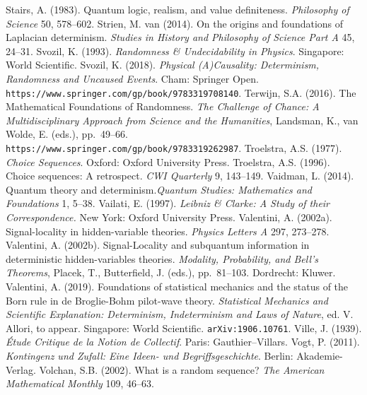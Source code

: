\documentclass[12pt]{article}
\numberwithin{equation}{section}
\begin{document}
\begin{thebibliography}{99}
  \bibitem{}
 Stairs, A. (1983).
 Quantum logic, realism, and value definiteness. \emph{Philosophy of Science} 50, 578--602. 
       \bibitem{}  Strien, M. van (2014). On the origins and foundations of Laplacian determinism.
       \emph{Studies in History and
 Philosophy of Science Part A} 45, 24--31.
  \bibitem{}  Svozil, K. (1993). \emph{Randomness \& Undecidability in Physics}. Singapore: World Scientific. 
   \bibitem{}  Svozil, K. (2018). \emph{Physical (A)Causality:
Determinism, Randomness and Uncaused Events}. Cham: Springer Open.  \verb#https://www.springer.com/gp/book/9783319708140#. 
 \bibitem{}  Terwijn, S.A. (2016). The Mathematical Foundations of Randomness. 
 \emph{The Challenge of Chance: A Multidisciplinary Approach from Science and the Humanities},   Landsman, K., van Wolde, E. (eds.),  pp.\ 49--66.  \verb#https://www.springer.com/gp/book/9783319262987#.
   \bibitem{}  Troelstra, A.S. (1977). \emph{Choice Sequences}. Oxford: Oxford University Press. 
  \bibitem{}  Troelstra, A.S. (1996). Choice sequences: A retrospect. \emph{CWI Quarterly} 9, 143--149.
  \bibitem{} Vaidman, L. (2014). Quantum theory and determinism.\emph{Quantum Studies: Mathematics and Foundations}
  1, 5--38. 
     \bibitem{} Vailati, E. (1997). \emph{Leibniz \& Clarke: A Study of their Correspondence.} New York: Oxford University Press. 
           \bibitem{}  Valentini, A. (2002a). Signal-locality in hidden-variable theories. \emph{Physics Letters A} 297, 273--278.  
    \bibitem{}  Valentini, A. (2002b).       Signal-Locality and subquantum information in deterministic hidden-variables theories. \emph{Modality, Probability, and Bell's Theorems}, Placek, T.,  Butterfield, J. (eds.), pp.\ 81--103.
Dordrecht: Kluwer. 
   \bibitem{} Valentini, A. (2019). Foundations of statistical mechanics and the status of the Born rule in de Broglie-Bohm pilot-wave theory. \emph{Statistical Mechanics and Scientific Explanation: Determinism, Indeterminism and Laws of Nature}, ed. V. Allori, to appear.  Singapore: World Scientific. \verb#arXiv:1906.10761#.  
     \bibitem{}  Ville, J. (1939). \emph{\'{E}tude Critique de la Notion de Collectif}. Paris: Gauthier--Villars.        
  \bibitem{}  Vogt, P. (2011). \emph{Kontingenz und Zufall: Eine Ideen- und Begriffsgeschichte}. Berlin: Akademie-Verlag. 
      \bibitem{} Volchan, S.B. (2002). What is a random sequence? \emph{The American Mathematical Monthly} 109, 46--63.
   \bibitem{}

\end{thebibliography}
\end{document}
